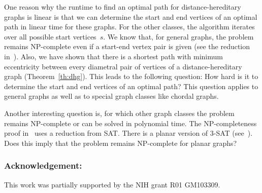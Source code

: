 \documentclass[10pt]{llncs}
\begin{document}
One reason why the runtime to find an optimal path for distance-hereditary graphs is linear is that we can determine the start and end vertices of an optimal path in linear time for these graphs.
For the other classes, the algorithm iterates over all possible start vertices~$s$.
We know that, for general graphs, the problem remains NP-complete even if a start-end vertex pair is given (see the reduction in~\cite{DrLei2015}).
Also, we have shown that there is a shortest path with minimum eccentricity between every diametral pair of vertices of a distance-hereditary graph (Theorem~\ref{th:dhg}).
This leads to the following question:
How hard is it to determine the start and end vertices of an optimal path?
This question applies to general graphs as well as to special graph classes like chordal graphs.

Another interesting question is, for which other graph classes the problem remains NP-complete or can be solved in polynomial time.
The NP-completeness proof in~\cite{DrLei2015} uses a reduction from SAT.
There is a planar version of 3-SAT (see~\cite{Lichtenstein1982}).
Does this imply that the problem remains NP-complete for planar graphs?

\subsubsection{Acknowledgement:}
This work was partially supported by the NIH grant R01 GM103309.
\end{document}
